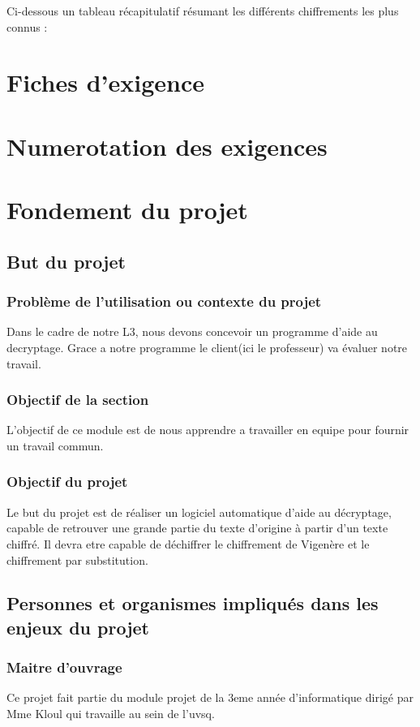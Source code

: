 \documentclass[a4]{article}
\begin{document}
				Ci-dessous un tableau récapitulatif résumant les différents chiffrements les plus connus :
				
				
				
		\section{Fiches d'exigence}
				 
	\section{Numerotation des exigences}
				 
		
	\section{Fondement du projet}
		\subsection{But du projet} 
			\subsubsection{Problème de l'utilisation ou contexte du projet}
				Dans le cadre de notre L3, nous devons concevoir un programme d'aide au decryptage.
				Grace a notre programme le client(ici le professeur) va évaluer notre travail.
			\subsubsection{Objectif de la section}
				L'objectif de ce module est de nous apprendre a travailler en equipe pour fournir un travail commun.
			\subsubsection{Objectif du projet}
				Le but du projet est de réaliser un logiciel automatique d'aide au décryptage, capable de retrouver une grande partie du texte d'origine à partir d'un texte chiffré. Il devra etre capable de déchiffrer le chiffrement de Vigenère et le chiffrement par substitution.
		\subsection{Personnes et organismes impliqués dans les enjeux du projet} 
			\subsubsection{Maitre d'ouvrage}
				Ce projet fait partie du module projet de la 3eme année d'informatique dirigé par Mme Kloul qui travaille au sein de l'uvsq.			
\end{document}
